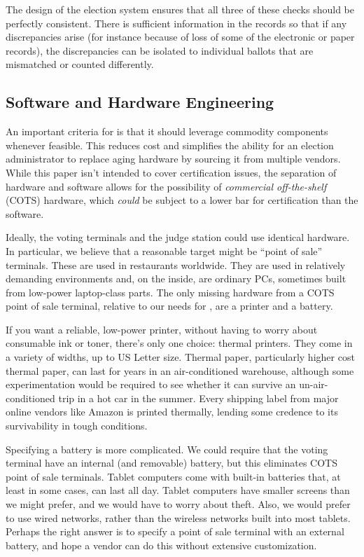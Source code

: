 The design of the election system ensures that all three of these checks should be perfectly consistent.  There is sufficient information in the records so that if any discrepancies arise (for instance because of loss of some of the electronic or paper records), the discrepancies can be isolated to individual ballots that are mismatched or counted differently.

\subsection{Software and Hardware Engineering}
\label{sec:sw-hw-eng}

An important criteria for \projname is that it should leverage commodity components whenever feasible. This reduces cost and simplifies the ability for an election administrator to replace aging hardware by sourcing it from multiple vendors. While this paper isn't intended to cover certification issues, the separation of hardware and software allows for the possibility of {\em commercial off-the-shelf} (COTS) hardware, which {\em could} be subject to a lower bar for certification than the software.

Ideally, the voting terminals and the judge station could use identical hardware. In particular, we believe that a reasonable target might be ``point of sale'' terminals. These are used in restaurants worldwide. They are used in relatively demanding environments and, on the inside, are ordinary PCs, sometimes built from low-power laptop-class parts. The only missing hardware from a COTS point of sale terminal, relative to our needs for \projname, are a printer and a battery.

If you want a reliable, low-power printer, without having to worry about consumable ink or toner, there's only one choice: thermal printers. They come in a variety of widths, up to US Letter size. Thermal paper, particularly higher cost thermal paper, can last for years in an air-conditioned warehouse, although some experimentation would be required to see whether it can survive an un-air-conditioned trip in a hot car in the summer. Every shipping label from major online vendors like Amazon is printed thermally, lending some credence to its survivability in tough conditions.


Specifying a battery is more complicated. We could require that the voting terminal have an internal (and removable) battery, but this eliminates COTS point of sale terminals. Tablet computers come with built-in batteries that, at least in some cases, can last all day. Tablet computers have smaller screens than we might prefer, and we would have to worry about theft. Also, we would prefer to use wired networks, rather than the wireless networks built into most tablets. Perhaps the right answer is to specify a point of sale terminal with an external battery, and hope a vendor can do this without extensive customization.

